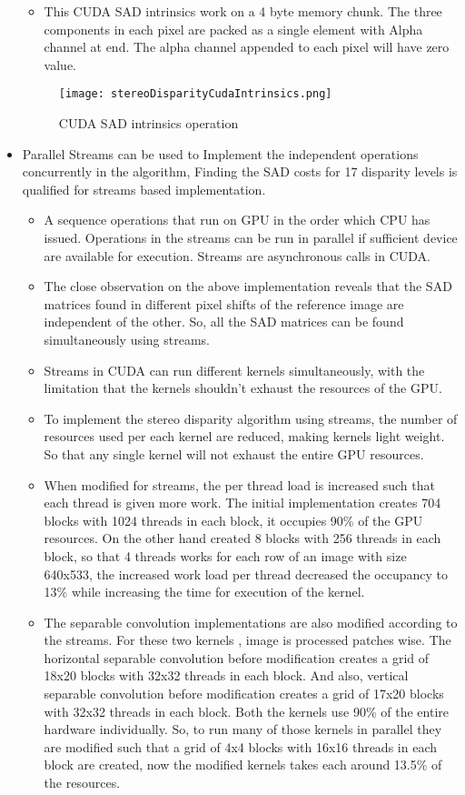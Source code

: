 \begin{itemize}
\begin{itemize}
		\item This CUDA SAD intrinsics work on a 4 byte memory chunk. The three components in each pixel are packed as a single element with Alpha channel at end. The alpha channel appended to each pixel will have zero value.
	\end{itemize}
	\begin{figure}[h!]
		\centering
		\texttt{[image: stereoDisparityCudaIntrinsics.png]}
		\caption{CUDA SAD intrinsics operation}
		\label{fig:CUDA intrinsics}
	\end{figure}
	\item Parallel Streams can be used to Implement the independent operations concurrently in the algorithm, Finding the SAD costs for 17 disparity levels is qualified for streams based implementation.
	\begin{itemize}
		\item A sequence operations that run on GPU in the order which CPU has issued. Operations in the streams can be run in parallel if sufficient device are available for execution. Streams are asynchronous calls in CUDA.
		\item The close observation on the above implementation reveals that the SAD matrices found in different pixel shifts of the reference image are independent of the other. So, all the SAD matrices can be found simultaneously using streams.
		\item Streams in CUDA can run different kernels simultaneously, with the limitation that the kernels shouldn’t exhaust the resources of the GPU.
		\item To implement the stereo disparity algorithm using streams, the number of resources used per each kernel are reduced, making kernels light weight. So that any single kernel will not exhaust the entire GPU resources.
		\item When modified for streams, the per thread load is increased such that each thread is given more work. The initial implementation creates 704 blocks with 1024 threads in each block, it occupies 90\% of the GPU resources. On the other hand created 8 blocks with 256 threads in each block, so that 4 threads works for each row of an image with size 640x533, the increased work load per thread decreased the occupancy to 13\% while increasing the time for execution of the kernel.
		\item The separable convolution implementations are also modified according to the streams. For these two kernels , image is processed patches wise. The horizontal separable convolution before modification creates a grid of 18x20 blocks with 32x32 threads in each block. And also, vertical separable convolution before modification creates a grid of 17x20 blocks with 32x32 threads in each block. Both the kernels use 90\% of the entire hardware individually. So, to run many of those kernels in parallel they are modified such that a grid of 4x4 blocks with 16x16 threads in each block are created, now the modified kernels takes each around 13.5\% of the resources.

\end{itemize}
\end{itemize}
